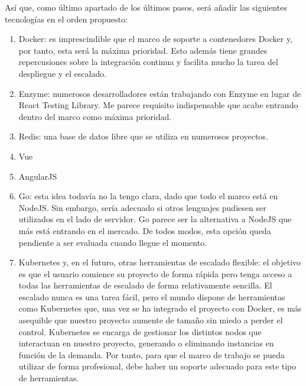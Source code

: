 Así que, como último apartado de los últimos pasos, será añadir las siguientes tecnologías en el orden propuesto:
\begin{enumerate}
  \item Docker: es imprescindible que el marco de soporte a contenedores Docker y, por tanto, esta será la máxima prioridad. Esto además tiene grandes repercusiones sobre la integración continua y facilita mucho la tarea del despliegue y el escalado.
  \item Enzyme: numerosos desarrolladores están trabajando con Enzyme en lugar de React Testing Library. Me parece requisito indispensable que acabe entrando dentro del marco como máxima prioridad.
  \item Redis: una base de datos libre que se utiliza en numerosos proyectos.
  \item Vue
  \item AngularJS
  \item Go: esta idea todavía no la tengo clara, dado que todo el marco está en NodeJS. Sin embargo, sería adecuado si otros lenguajes pudiesen ser utilizados en el lado de servidor. Go parece ser la alternativa a NodeJS que más está entrando en el mercado. De todos modos, esta opción queda pendiente a ser evaluada cuando llegue el momento.
  \item Kubernetes y, en el futuro, otras herramientas de escalado flexible: el objetivo es que el usuario comience su proyecto de forma rápida pero tenga acceso a todas las herramientas de escalado de forma relativamente sencilla. El escalado nunca es una tarea fácil, pero el mundo dispone de herramientas como Kubernetes que, una vez se ha integrado el proyecto con Docker, es más asequible que nuestro proyecto aumente de tamaño sin miedo a perder el control. Kubernetes se encarga de gestionar los distintos nodos que interactuan en nuestro proyecto, generando o eliminando instancias en función de la demanda. Por tanto, para que el marco de trabajo se pueda utilizar de forma profesional, debe haber un soporte adecuado para este tipo de herramientas.
\end{enumerate}
